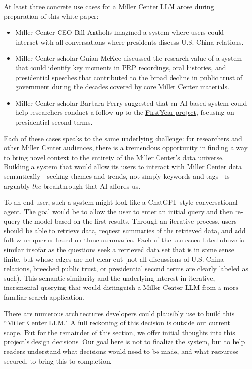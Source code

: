 \documentclass[12pt, oneside]{article}   	%
\begin{document}
At least three concrete use cases for a Miller Center LLM arose during preparation of this white paper:
\begin{itemize}
\item Miller Center CEO Bill Antholis imagined a system where users could interact with all conversations where presidents discuss U.S.-China relations. 
\item Miller Center scholar Guian McKee discussed the research value of a system that could identify key moments in PRP recordings, oral histories, and presidential speeches that contributed to the broad decline in public trust of government during the decades covered by core Miller Center materials. 
\item Miller Center scholar Barbara Perry suggested that an AI-based system could help researchers conduct a follow-up to the \href{firstyear2017.org}{FirstYear project}, focusing on presidential second terms.
\end{itemize}
Each of these cases speaks to the same underlying challenge: for researchers and other Miller Center audiences, there is a tremendous opportunity in finding a way to bring novel context to  the entirety of the Miller Center's data universe.  Building a system that would allow its users to interact with Miller Center data semantically---seeking themes and trends, not simply keywords and tags---is arguably \emph{the} breakthrough that AI affords us.

To an end user, such a system might look like a ChatGPT-style conversational agent.  The goal would be to allow the user to enter an initial query and then re-query the model based on the first results.  Through an iterative process, users should be able to retrieve data, request  summaries of the retrieved data, and add follow-on queries based on these summaries.  Each of the use-cases listed above is similar insofar as the questions seek a retrieved data set that is in some sense finite, but whose edges are not clear cut (not all discussions of U.S.-China relations, breeched public trust, or presidential second terms are clearly labeled as such).  This semantic similarity and the underlying interest in iterative, incremental querying that would distinguish a Miller Center LLM from a more familiar search application.

There are numerous architectures developers could plausibly use to build this ``Miller Center LLM."  A full reckoning of this decision is outside our current scope.  But for the remainder of this section, we offer initial thoughts into this project's design decisions.  Our goal here is not to finalize the system, but to help readers understand what decisions would need to be made, and what resources secured, to bring this to completion.
\end{document}
